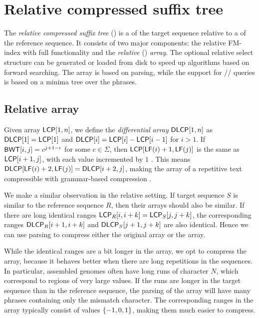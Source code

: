 
\section{Relative compressed suffix tree}

The \emph{relative compressed suffix tree} (\RCST) is a \CSTnpr{} of the
target sequence relative to a \CST{} of the reference sequence. It consists of
two major components: the relative FM-index with full functionality and the
\emph{relative} \LCP{} (\RLCP) \emph{array}. The optional relative select
structure can be generated or loaded from disk to speed up algorithms based on
forward searching. The \RLCP{} array is based on \RLZ{} parsing, while the
support for \nsv/\psv/\rmq{} queries is based on a minima tree over the
phrases.

\subsection{Relative \LCP{} array}

Given \LCP{} array $\mathsf{LCP}[1,n]$, we define the \emph{differential} \LCP{}
\emph{array} $\mathsf{DLCP}[1,n]$ as $\mathsf{DLCP}[1] = \mathsf{LCP}[1]$ and $\mathsf{DLCP}[i] = \mathsf{LCP}[i]
- \mathsf{LCP}[i-1]$ for $i > 1$. If $\mathsf{BWT}[i,j] = c^{j+1-i}$ for some $c \in
\Sigma$, then $\mathsf{LCP}[\mathsf{LF}(i)+1,\mathsf{LF}(j)]$ is the same as $\mathsf{LCP}[i+1,j]$, with
each value incremented by $1$ \cite{Fischer2009a}. This means
$\mathsf{DLCP}[\mathsf{LF}(i)+2,\mathsf{LF}(j)] = \mathsf{DLCP}[i+2,j]$, making the \DLCP{} array of a
repetitive text compressible with grammar-based compression
\cite{Abeliuk2013}.

We make a similar observation in the relative setting. If target sequence $S$
is similar to the reference sequence $R$, then their \LCP{} arrays should also
be similar. If there are long identical ranges $\mathsf{LCP}_{R}[i,i+k] =
\mathsf{LCP}_{S}[j,j+k]$, the corresponding \DLCP{} ranges $\mathsf{DLCP}_{R}[i+1,i+k]$ and
$\mathsf{DLCP}_{S}[j+1,j+k]$ are also identical. Hence we can use \RLZ{} parsing to
compress either the original \LCP{} array or the \DLCP{} array.

While the identical ranges are a bit longer in the \LCP{} array, we opt to
compress the \DLCP{} array, because it behaves better when there are long
repetitions in the sequences. In particular, assembled genomes often have long
runs of character $N$, which correspond to regions of very large \LCP{}
values. If the runs are longer in the target sequence than in the reference
sequence, the \RLZ{} parsing of the \LCP{} array will have many phrases
containing only the mismatch character. The corresponding ranges in the
\DLCP{} array typically consist of values $\{ -1, 0, 1 \}$, making them much
easier to compress.

